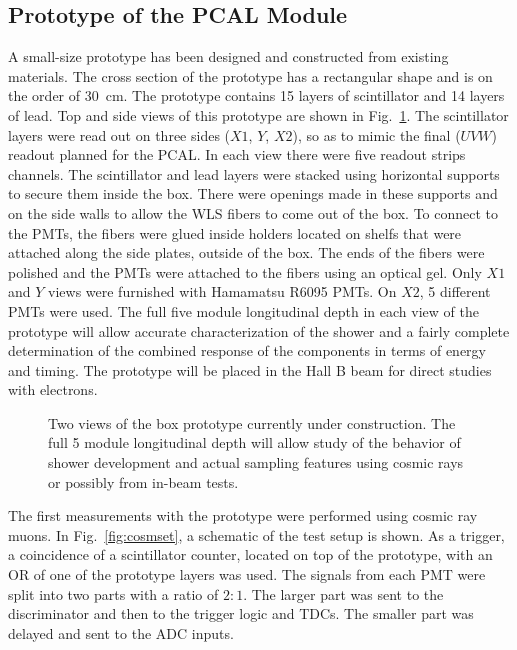 \clearpage

\subsection{Prototype of the PCAL Module}

A small-size prototype has been designed and constructed from existing
materials.  The cross section of the prototype has a rectangular shape and 
is on the order of 30~cm.  The prototype contains 15 layers of scintillator 
and 14 layers of lead.  Top and side views of this prototype are shown in 
Fig.~\ref{fig:boxpro1}.  The scintillator layers were read out on three 
sides ($X1$, $Y$, $X2$), so as to mimic the final ($UVW$) readout planned 
for the PCAL.  In each view there were five readout strips channels. 
The scintillator and lead layers were stacked using horizontal supports to 
secure them inside the box.  There were openings made in these supports and 
on the side walls to allow the WLS fibers to come out of the box.  To connect 
to the PMTs, the fibers were glued inside holders located on shelfs that were 
attached along the side plates, outside of the box.  The ends of the fibers 
were polished and the PMTs were attached to the fibers using an optical gel. 
Only $X1$ and $Y$ views were furnished with Hamamatsu R6095 PMTs. On $X2$, 
5 different PMTs were used.  The full five module longitudinal depth in each 
view of the prototype will allow accurate characterization of the shower and 
a fairly complete determination of the combined response of the components in 
terms of energy and timing.  The prototype will be placed in the Hall B beam 
for direct studies with electrons.

\begin{figure}[htb]
\vspace{8.5cm} 
\caption{\small{Two views of the box prototype currently under construction. 
The full 5 module longitudinal depth will allow study of the behavior of 
shower development and actual sampling features using cosmic rays or
possibly from in-beam tests.}}
\label{fig:boxpro1}
\end{figure}

The first measurements with the prototype were performed using cosmic ray
muons.  In Fig.~\ref{fig:cosmset}, a schematic of the test setup is shown. 
As a trigger, a coincidence of a scintillator counter, located on top of
the prototype, with an OR of one of the prototype layers was used.  The
signals from each PMT were split into two parts with a ratio of $2:1$.  The 
larger part was sent to the discriminator and then to the trigger logic 
and TDCs.  The smaller part was delayed and sent to the ADC inputs. 

